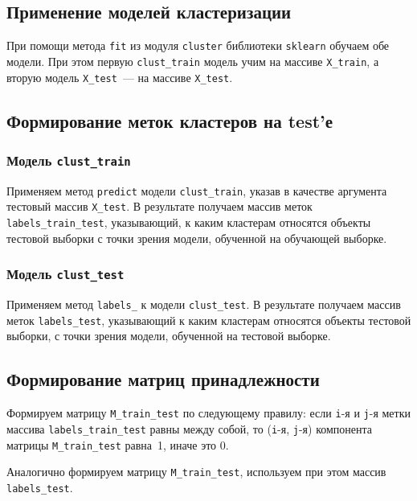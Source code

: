 \documentclass[a4paper,12pt]{article}
\begin{document}
\subsection{Применение моделей кластеризации}


При помощи метода \texttt{fit} из модуля \texttt{cluster} библиотеки \texttt{sklearn} обучаем обе модели. При этом первую \texttt{clust\_train} модель учим на массиве \texttt{X\_train}, а вторую модель \texttt{X\_test} — на массиве \texttt{X\_test}.

\subsection{Формирование меток кластеров на test'е}

\subsubsection{Модель \texttt{clust\_train}} 

Применяем метод \texttt{predict} модели \texttt{clust\_train}, указав в качестве аргумента тестовый массив \texttt{X\_test}. В результате получаем массив меток \texttt{labels\_train\_test}, указывающий, к каким кластерам относятся объекты тестовой выборки с точки зрения модели, обученной на обучающей выборке.


\subsubsection{Модель \texttt{clust\_test}}

Применяем метод \texttt{labels\_} к модели \texttt{clust\_test}. В результате получаем массив меток \texttt{labels\_test}, указывающий к каким кластерам относятся объекты тестовой выборки, с точки зрения модели, обученной на тестовой выборке.


\subsection{Формирование матриц принадлежности}

Формируем матрицу \texttt{M\_train\_test} по следующему правилу: если \texttt{i}-я и \texttt{j}-я метки массива \texttt{labels\_train\_test} равны между собой, то (\texttt{i}-я, \texttt{j}-я) компонента матрицы \texttt{M\_train\_test} равна 1, иначе это 0.

Аналогично формируем матрицу \texttt{M\_train\_test}, используем при этом массив  \texttt{labels\_test}.
\end{document}

